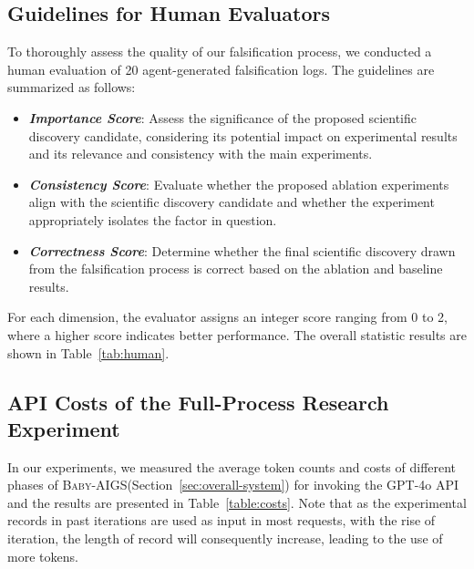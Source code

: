 \documentclass{article} %
\newcommand{\AIGSSys}{\textsc{Baby-AIGS}\xspace}
\begin{document}
\subsection{Guidelines for Human Evaluators}
\label{sec:human_evaluator}

To thoroughly assess the quality of our falsification process, we conducted a human evaluation of 20 agent-generated falsification logs. The guidelines are summarized as follows:

\begin{itemize}
    \item \textit{\textbf{Importance Score}}: Assess the significance of the proposed scientific discovery candidate, considering its potential impact on experimental results and its relevance and consistency with the main experiments.
    \item \textit{\textbf{Consistency Score}}: Evaluate whether the proposed ablation experiments align with the scientific discovery candidate and whether the experiment appropriately isolates the factor in question.
    \item \textit{\textbf{Correctness Score}}: Determine whether the final scientific discovery drawn from the falsification process is correct based on the ablation and baseline results.
\end{itemize}

For each dimension, the evaluator assigns an integer score ranging from 0 to 2, where a higher score indicates better performance. The overall statistic results are shown in Table~\ref{tab:human}. 

\subsection{API Costs of the Full-Process Research Experiment}\label{app:token-anal}
In our experiments, we measured the average token counts and costs of different phases of \AIGSSys (Section~\ref{sec:overall-system}) for invoking the GPT-4o API and the results are presented in Table~\ref{table:costs}. Note that as the experimental records in past iterations are used as input in most requests, with the rise of iteration, the length of record will consequently increase, leading to the use of more tokens. %
\end{document}

